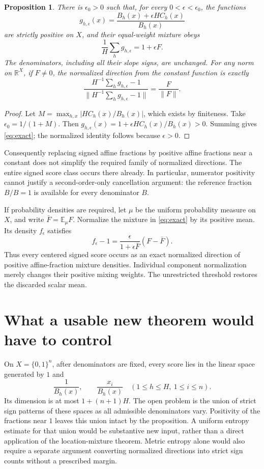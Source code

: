 \documentclass[11pt]{article}
\newtheorem{proposition}{Proposition}
\begin{document}
\begin{proposition}
There is $\epsilon_0>0$ such that, for every
$0<\epsilon<\epsilon_0$, the functions
\[
 g_{h,\epsilon}(x)=
 \frac{B_h(x)+\epsilon H C_h(x)}{B_h(x)}
\]
are strictly positive on $X$, and their equal-weight mixture obeys
\[
 \frac1H\sum_h g_{h,\epsilon}=1+\epsilon F.
 \tag{1}\label{eq:exact}
\]
The denominators, including all their slope signs, are unchanged.
For any norm on $\mathbb R^X$, if $F\ne0$, the normalized direction
from the constant function is exactly
\[
 \frac{H^{-1}\sum_h g_{h,\epsilon}-1}
 {\|H^{-1}\sum_h g_{h,\epsilon}-1\|}
 =\frac F{\|F\|}.
\]
\end{proposition}
\begin{proof}
Let $M=\max_{h,x}|HC_h(x)/B_h(x)|$, which exists by finiteness.
Take $\epsilon_0=1/(1+M)$. Then
$g_{h,\epsilon}(x)=1+\epsilon HC_h(x)/B_h(x)>0$.
Summing gives \eqref{eq:exact}; the normalized identity follows
because $\epsilon>0$.
\end{proof}

Consequently replacing signed affine fractions by positive affine
fractions near a constant does not simplify the required family of
normalized directions. The entire signed score class occurs there
already. In particular, numerator positivity cannot justify a
second-order-only cancellation argument: the reference fraction
$B/B=1$ is available for every denominator $B$.

If probability densities are required, let $\mu$ be the uniform
probability measure on $X$, and write $\bar F=\mathbb E_\mu F$.
Normalize the mixture in \eqref{eq:exact} by its positive mean.
Its density $f_\epsilon$ satisfies
\[
 f_\epsilon-1
 =\frac{\epsilon}{1+\epsilon\bar F}(F-\bar F).
\]
Thus every centered signed score occurs as an exact normalized
direction of positive affine-fraction mixture densities. Individual
component normalization merely changes their positive mixing weights.
The unrestricted threshold restores the discarded scalar mean.

\section{What a usable new theorem would have to control}
On $X=\{0,1\}^n$, after denominators are fixed, every score lies
in the linear space generated by $1$ and
\[
 \frac1{B_h(x)},\qquad \frac{x_i}{B_h(x)}
 \quad (1\leq h\leq H,\ 1\leq i\leq n).
\]
Its dimension is at most $1+(n+1)H$. The open problem is the union
of strict sign patterns of these spaces as all admissible
denominators vary. Positivity of the fractions near $1$ leaves this
union intact by the proposition. A uniform entropy estimate for
that union would be substantive new input, rather than a direct
application of the location-mixture theorem. Metric entropy alone
would also require a separate argument converting normalized
directions into strict sign counts without a prescribed margin.
\end{document}
